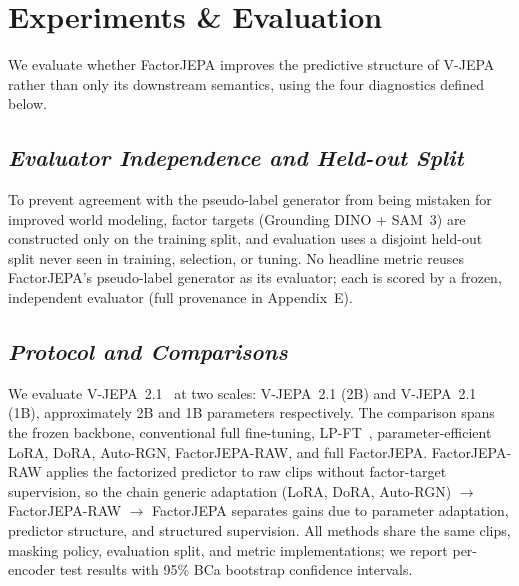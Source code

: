 \section{Experiments \& Evaluation}
\label{sec:experiments}

We evaluate whether FactorJEPA improves the predictive structure of V-JEPA
rather than only its downstream semantics, using the four diagnostics defined below.


\subsection{\textbf{\emph{Evaluator Independence and Held-out Split}}}
\label{sec:evaluator_independence}

To prevent agreement with the pseudo-label generator from being mistaken for
improved world modeling, factor targets (Grounding DINO + SAM~3) are constructed
only on the training split, and evaluation uses a disjoint held-out split never seen
in training, selection, or tuning. No headline metric reuses FactorJEPA's
pseudo-label generator as its evaluator; each is scored by a frozen, independent
evaluator (full provenance in Appendix~E).

\subsection{\textbf{\emph{Protocol and Comparisons}}}

We evaluate V-JEPA~2.1~\cite{murlabadia2026vjepa21, assran2025vjepa2} at two scales: V-JEPA~2.1 (2B) and V-JEPA~2.1 (1B),
approximately 2B and 1B parameters respectively. The comparison spans the frozen
backbone, conventional full fine-tuning, LP-FT~\cite{kumar2022lpft}, parameter-efficient LoRA, DoRA,
Auto-RGN, FactorJEPA-RAW, and full FactorJEPA.
FactorJEPA-RAW applies the factorized predictor to raw clips without
factor-target supervision, so the chain generic adaptation
(LoRA, DoRA, Auto-RGN) $\to$ FactorJEPA-RAW $\to$ FactorJEPA separates gains due to
parameter adaptation, predictor structure, and structured supervision. All methods
share the same clips, masking policy, evaluation split, and metric implementations;
we report per-encoder test results with 95\% BCa bootstrap confidence intervals.






